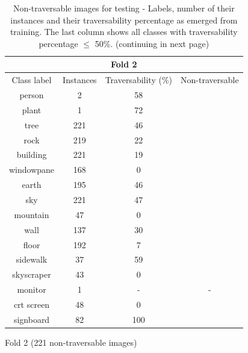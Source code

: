 \documentclass[12pt,a4paper,table,dvipsnames,tikz]{report}
\begin{document}
\begin{table}[h!]
\begin{subtable}[h!]{\textwidth}
\begin{tabular}{|c|c|c|c|}
				\hline
				\multicolumn{4}{|c|}{Fold 2}\\
				\hline
				Class label & Instances & Traversability (\%) & Non-traversable\\
				\hline\hline
				person & 2 & 58 &\\
				\hline
				plant & 1 & 72 &\\
				\hline
				\rowcolor{tree}
				tree & 221 & 46 & \checkmark\\
				\hline
				rock & 219 & 22 & \checkmark\\
				\hline
				building & 221 & 19 & \checkmark\\
				\hline
				windowpane & 168 & 0 & \checkmark\\
				\hline
				\rowcolor{earth}
				earth & 195 & 46 & \checkmark\\
				\hline
				\rowcolor{sky}
				sky & 221 & 47 & \checkmark\\
				\hline
				mountain & 47 & 0 & \checkmark\\
				\hline
				wall & 137 & 30 & \checkmark\\
				\hline
				floor & 192 & 7 & \checkmark\\
				\hline
				sidewalk & 37 & 59 &\\
				\hline
				skyscraper & 43 & 0 & \checkmark\\
				\hline
				monitor & 1 & - & -\\
				\hline
				crt screen & 48 & 0 & \checkmark\\
				\hline
				signboard & 82 & 100 &\\
				\hline
			\end{tabular}
			\caption{Fold 2 (221 non-traversable images)}
			\label{table:obst.f2}
		\end{subtable}
		\caption{Non-traversable images for testing - Labels, number of their instances and their 
			traversability percentage as emerged from training. The last column shows all classes 
			with traversability percentage $\le$ 50\%. (continuing in next page)}
		\label{table:obst.folds}
	\end{table}
	
\end{document}
